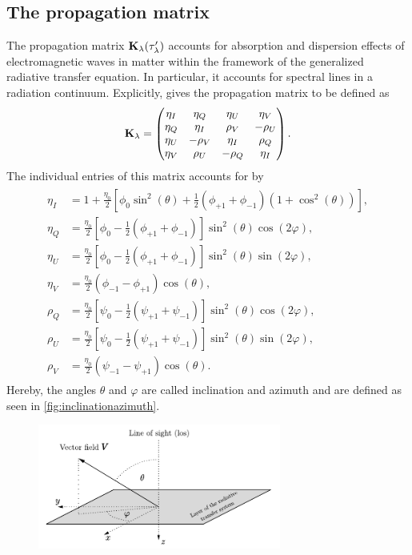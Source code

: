 \documentclass[a4paper,12pt]{report}
\begin{document}
\subsection{The propagation matrix}\label{sec:propagationmatrix}
The propagation matrix $\boldsymbol{\mathbf{K}}_\lambda(\tau_\lambda^\prime)$ accounts for absorption and dispersion effects of electromagnetic waves in matter within the framework of the generalized radiative transfer equation. In particular, it accounts for spectral lines in a radiation continuum. Explicitly, \cite[p.154]{Stix.2002} gives the propagation matrix to be defined as \begin{equation}
\boldsymbol{\mathbf{K}}_\lambda = \begin{pmatrix}
\eta_I & \eta_Q & \eta_U & \eta_V \\
\eta_Q & \eta_I & \rho_V & -\rho_U \\
\eta_U & -\rho_V & \eta_I & \rho_Q \\
\eta_V & \rho_U & -\rho_Q & \eta_I
\end{pmatrix}.
\end{equation} The individual entries of this matrix \cite[p.116]{delToroIniesta.2003} accounts for by \begin{align}\begin{aligned}
\eta_I &= 1 + \frac{\eta_0}{2}\left[\phi_0\sin^2(\theta) + \frac{1}{2}(\phi_{+1}+\phi_{-1})(1+\cos^2(\theta))\right], \\
\eta_Q &= \frac{\eta_0}{2}\left[\phi_0-\frac{1}{2}(\phi_{+1}+\phi_{-1})\right]\sin^2(\theta)\cos(2\varphi), \\
\eta_U &= \frac{\eta_0}{2}\left[\phi_0 - \frac{1}{2}(\phi_{+1}+\phi_{-1})\right]\sin^2(\theta)\sin(2\varphi), \\
\eta_V &= \frac{\eta_0}{2}(\phi_{-1}-\phi_{+1})\cos(\theta), \\
\rho_Q &= \frac{\eta_0}{2}\left[\psi_0-\frac{1}{2}(\psi_{+1}+\psi_{-1})\right]\sin^2(\theta)\cos(2\varphi), \\
\rho_U &= \frac{\eta_0}{2}\left[\psi_0-\frac{1}{2}(\psi_{+1}+\psi_{-1})\right]\sin^2(\theta)\sin(2\varphi), \\
\rho_V &= \frac{\eta_0}{2}(\psi_{-1}-\psi_{+1})\cos(\theta).
\end{aligned}
\end{align} Hereby, the angles $\theta$ and $\varphi$ are called inclination and azimuth and are defined as seen in \cref{fig:inclinationazimuth}. \begin{figure}[h]
\centering
\includegraphics[width=8cm]{figures/inclinationazimuth.pdf}

\end{figure}
\end{document}

